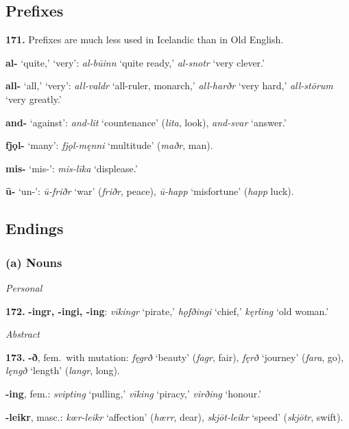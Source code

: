 \documentclass[12pt,letterpaper]{book}
\newcommand{\gap}[1][.25in]{\hspace{#1}}
\begin{document}
\subsection{Prefixes}

\textbf{171.} Prefixes are much less used in Icelandic than in Old
English.

\gap\textbf{al-} `quite,' `very': \textit{al-būinn} `quite ready,' \textit{al-snotr}
`very clever.'

\gap\textbf{all-} `all,' `very': \textit{all-valdr} `all-ruler, monarch,'
\textit{all-harðr} `very hard,' \textit{all-stōrum} `very greatly.'

\gap\textbf{and-} `against': \textit{and-lit} `countenance' (\textit{lita}, look),
\textit{and-svar} `answer.'

\gap\textbf{fjǫl-} `many': \textit{fjǫl-męnni} `multitude' (\textit{maðr}, man).

\gap\textbf{mis-} `mis-': \textit{mis-līka} `displease.'

\gap\textbf{ū-} `un-': \textit{ū-friðr} `war' (\textit{friðr}, peace), \textit{ū-happ}
`misfortune' (\textit{happ} luck).

\subsection{Endings}

\subsubsection{(a) Nouns}

\begin{center}
\textit{Personal}
\end{center}

\textbf{172.} \textbf{-ingr, -ingi, -ing}: \textit{vīkingr} `pirate,' \textit{hǫfðingi}
`chief,' \textit{kęrling} `old woman.'

\begin{center}
\textit{Abstract}
\end{center}

\textbf{173.} \textbf{-ð}, fem.\ with mutation: \textit{fęgrð} `beauty' (\textit{fagr},
fair), \textit{fęrð} `journey' (\textit{fara}, go), \textit{lęngð} `length'
(\textit{langr}, long).

\gap\textbf{-ing}, fem.: \textit{svipting} `pulling,' \textit{vīking} `piracy,'
\textit{virðing} `honour.'

\gap\textbf{-leikr}, masc.: \textit{kœr-leikr} `affection' (\textit{hœrr}, dear),
\textit{skjōt-leikr} `speed' (\textit{skjōtr}, swift).
\end{document}
